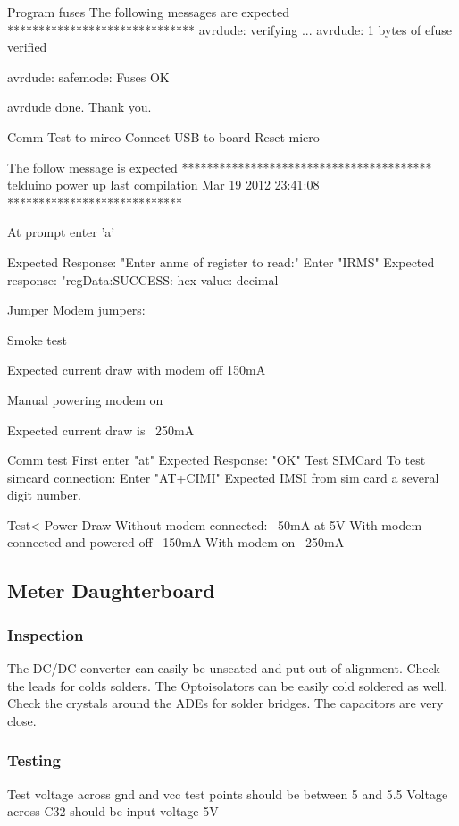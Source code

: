 \documentclass[]{article}
\begin{document}
                Program fuses
                The following messages are expected 
                ******************************
                avrdude: verifying ...
avrdude: 1 bytes of efuse verified

avrdude: safemode: Fuses OK

avrdude done.  Thank you.


Comm Test to mirco
    Connect USB to board
    Reset micro

    The follow message is expected
        ****************************************
        telduino power up
        last compilation
        Mar 19 2012
        23:41:08
        ****************************

    At prompt enter 'a' 

    Expected Response: "Enter anme of register to read:"
    Enter "IRMS"
    Expected response: "regData:SUCCESS: hex value: decimal

Jumper Modem jumpers: 

Smoke test

    Expected current draw with modem off 150mA
    
Manual powering modem on

    Expected current draw is ~250mA

Comm test
First enter "at"
Expected Response: "OK"
Test SIMCard
    To test simcard connection:
    Enter "AT+CIMI"
    Expected IMSI from sim card a several digit number.


        Test< Power Draw
                Without modem connected: ~50mA at 5V
                With modem connected and powered off ~150mA
                With modem on ~250mA



    \subsection{Meter Daughterboard}


            
        \subsubsection{Inspection}
            The DC/DC converter can easily be unseated and put out of alignment. Check the leads for colds solders.
            The Optoisolators can be easily cold soldered as well.
            Check the crystals around the ADEs for solder bridges. The capacitors are very close.
        \subsubsection{Testing}
            Test voltage across gnd and vcc test points should be between 5 and 5.5
            Voltage across C32 should be input voltage 5V
\end{document}
